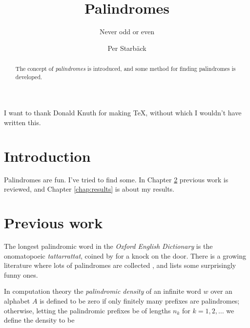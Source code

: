 \documentclass[thesis,fonts=libertine]{cluu}
\begin{document}
\author{Per Starbäck}
\title{Palindromes}
\subtitle{Never odd or even}

\maketitle

\begin{abstract}
  The concept of \emph{palindromes} is introduced, and some method for
  finding palindromes is developed.
\end{abstract}

\tableofcontents


I want to thank Donald Knuth for making \TeX, without which
I wouldn't have written this.


\chapter{Introduction}

Palindromes are fun. I've tried to find some.
In Chapter \ref{chap:prev} previous work is reviewed, and
Chapter \ref{chap:results} is about my results.

\chapter{Previous work}
\label{chap:prev}

The longest palindromic word in the \emph{Oxford English Dictionary}
is the onomatopoeic \emph{tattarrattat}, coined by
\textcite{joyce:ulysses} for a knock on the door.
There is a growing literature where lots of palindromes are collected
\parencite{chism92:a_to_z, bergerson73},
and \textcite{funny} lists some surprisingly funny ones.

In computation theory the \emph{palindromic density} of an infinite
word \( w \) over an alphabet \( A \) is defined to be zero if only
finitely many prefixes are palindromes; otherwise, letting the
palindromic prefixes be of lengths \( n_k \) for \( k=1, 2, \dots\) we
define the density to be 
\end{document}
